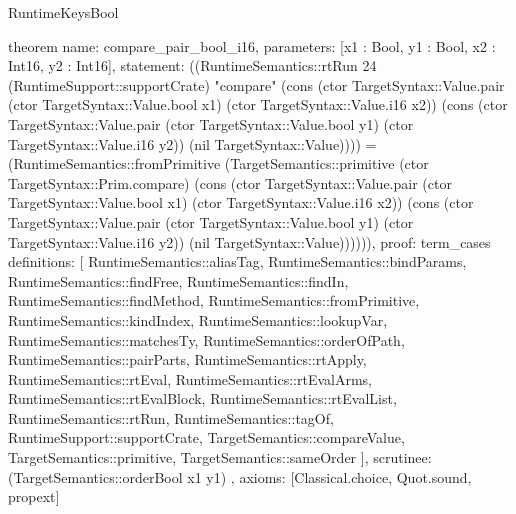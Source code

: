 \begin{lexlean}{RuntimeKeysBool}
\begin{semanticmodule}
theorem{
  name: compare_pair_bool_i16,
  parameters: [x1 : Bool, y1 : Bool, x2 : Int16, y2 : Int16],
  statement: ((RuntimeSemantics::rtRun 24 (RuntimeSupport::supportCrate) "compare" (cons (ctor TargetSyntax::Value.pair (ctor TargetSyntax::Value.bool x1) (ctor TargetSyntax::Value.i16 x2)) (cons (ctor TargetSyntax::Value.pair (ctor TargetSyntax::Value.bool y1) (ctor TargetSyntax::Value.i16 y2)) (nil TargetSyntax::Value)))) = (RuntimeSemantics::fromPrimitive (TargetSemantics::primitive (ctor TargetSyntax::Prim.compare) (cons (ctor TargetSyntax::Value.pair (ctor TargetSyntax::Value.bool x1) (ctor TargetSyntax::Value.i16 x2)) (cons (ctor TargetSyntax::Value.pair (ctor TargetSyntax::Value.bool y1) (ctor TargetSyntax::Value.i16 y2)) (nil TargetSyntax::Value)))))),
  proof: term_cases{
    definitions: [
      RuntimeSemantics::aliasTag,
      RuntimeSemantics::bindParams,
      RuntimeSemantics::findFree,
      RuntimeSemantics::findIn,
      RuntimeSemantics::findMethod,
      RuntimeSemantics::fromPrimitive,
      RuntimeSemantics::kindIndex,
      RuntimeSemantics::lookupVar,
      RuntimeSemantics::matchesTy,
      RuntimeSemantics::orderOfPath,
      RuntimeSemantics::pairParts,
      RuntimeSemantics::rtApply,
      RuntimeSemantics::rtEval,
      RuntimeSemantics::rtEvalArms,
      RuntimeSemantics::rtEvalBlock,
      RuntimeSemantics::rtEvalList,
      RuntimeSemantics::rtRun,
      RuntimeSemantics::tagOf,
      RuntimeSupport::supportCrate,
      TargetSemantics::compareValue,
      TargetSemantics::primitive,
      TargetSemantics::sameOrder
    ],
    scrutinee: (TargetSemantics::orderBool x1 y1)
  },
  axioms: [Classical.choice, Quot.sound, propext]
}


\end{semanticmodule}
\end{lexlean}
